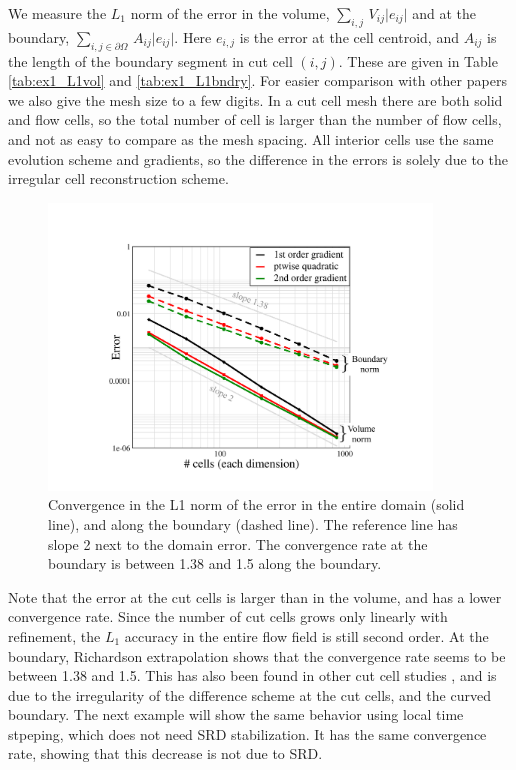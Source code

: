 We measure the $L_1$ norm of the error in the volume,   $\sum_{i,j} \,
V_{ij} \lvert e_{ij } \rvert$ and at the boundary, $ \sum_{{i,j} \in \partial \Omega} \, A_{ij} \lvert e_{ij
} \rvert$.  Here
$e_{i,j}$ is the error at the cell centroid, and $A_{ij}$ is the length of the 
boundary segment in cut cell $(i,j)$.
These are given in Table \ref{tab:ex1_L1vol} and \ref{tab:ex1_L1bndry}. 
For easier comparison with other papers we also give the mesh size 
to a few digits. In  a cut cell mesh there are both solid and
flow cells, so the total number of cell is larger than the number of
flow cells, and not as easy to compare as the mesh spacing.
All interior cells use the same evolution scheme and gradients, so
the difference in the errors is solely due to the irregular cell
reconstruction scheme.

\begin{figure}[h]
	\begin{center}
		\includegraphics[height=3.0in]{figs/gradientConv.pdf}
		\caption{\sf Convergence in the L1 norm of the error in the entire 
			domain  (solid line), and along the boundary (dashed line).
			The reference line has slope 2 next to the domain error. The convergence
			rate at the boundary is between 1.38 and 1.5
			along the boundary.
			\label{fig:ssv}}
	\end{center}
\end{figure}


Note that the error at the cut cells is larger than in the volume, and has a
lower convergence rate. Since the number of cut cells grows only
linearly with refinement, the $L_1$
accuracy in the entire flow field is still second order.  At the boundary,
Richardson extrapolation shows that the convergence rate seems to be
between 1.38 and 1.5.
This has also been found in other cut cell studies
\cite{KB:2006,nemec_tm14}, and is due to the irregularity of the
difference scheme at the cut cells, and the curved boundary. 
The next example will show the same behavior using local time stpeping,
which does not need SRD stabilization. It has the same convergence rate,
showing that this decrease is
not due to SRD.

